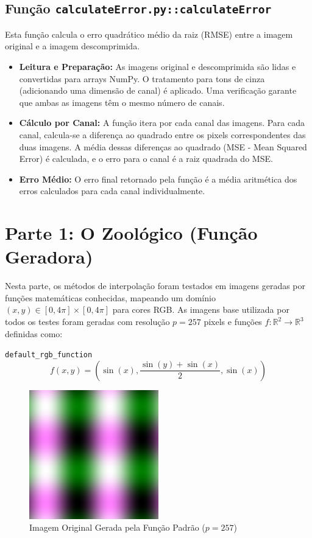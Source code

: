 \documentclass[12pt, a4paper]{article}
\begin{document}
\subsection{Função \texttt{calculateError.py::calculateError}}
Esta função calcula o erro quadrático médio da raiz (RMSE) entre a imagem original e a imagem descomprimida.
\begin{itemize}
    \item \textbf{Leitura e Preparação:} As imagens original e descomprimida são lidas e convertidas para arrays NumPy. O tratamento para tons de cinza (adicionando uma dimensão de canal) é aplicado. Uma verificação garante que ambas as imagens têm o mesmo número de canais.
    \item \textbf{Cálculo por Canal:} A função itera por cada canal das imagens. Para cada canal, calcula-se a diferença ao quadrado entre os pixels correspondentes das duas imagens. A média dessas diferenças ao quadrado (MSE - Mean Squared Error) é calculada, e o erro para o canal é a raiz quadrada do MSE.
    \item \textbf{Erro Médio:} O erro final retornado pela função é a média aritmética dos erros calculados para cada canal individualmente.
\end{itemize}

\section{Parte 1: O Zoológico (Função Geradora)}
Nesta parte, os métodos de interpolação foram testados em imagens geradas por funções matemáticas conhecidas, mapeando um domínio $(x, y) \in [0, 4\pi] \times [0, 4\pi]$ para cores RGB. As imagens base utilizada por todos os testes foram geradas com resolução $p=257$ pixels e funções $f: \mathbb{R}^2 \to \mathbb{R}^3$ definidas como:

\texttt{default\_rgb\_function}
$$ f(x,y) = \left( \sin(x), \frac{\sin(y)+\sin(x)}{2}, \sin(x) \right) $$

\begin{figure}[H]
    \centering
    \includegraphics[width=0.5\textwidth]{results/case_1/base_image.png}
    \caption{Imagem Original Gerada pela Função Padrão ($p=257$)}
    \label{fig:zoo_original_default}
\end{figure}
\end{document}
